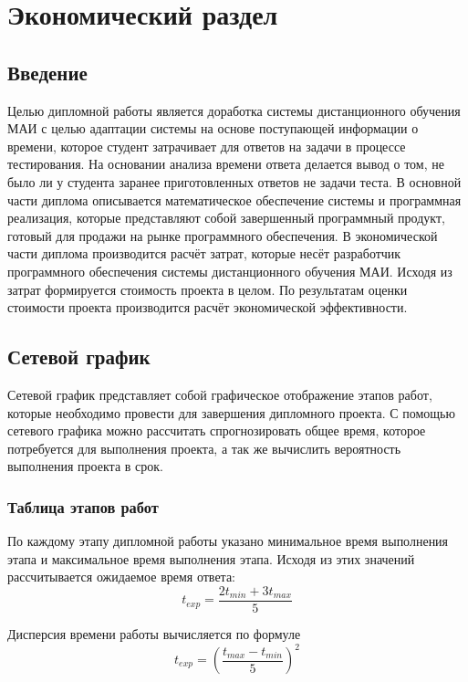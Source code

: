  \chapter{Экономический раздел}

 \section{Введение}

 Целью дипломной работы является доработка системы дистанционного обучения МАИ с целью адаптации системы на основе поступающей информа\-ции о времени, которое студент затрачивает для ответов на задачи в процессе тестирования. На основании анализа времени ответа делается вывод о том, не было ли у студента заранее приготовленных ответов не задачи теста.
В основной части диплома описывается математическое обеспечение системы и программная реализация, которые представляют собой завершенный прог\-раммный продукт, готовый для продажи на рынке программного обеспечения.
В экономической части диплома производится расчёт затрат, которые несёт разработчик программного обеспечения системы дистанционного обучения МАИ. Исходя из затрат формируется стоимость проекта в целом. По результа\-там оценки стоимости проекта производится расчёт экономической эффектив\-ности.

\section{Сетевой график}

Сетевой график представляет собой графическое отображение этапов работ, которые необходимо провести для завершения дипломного проекта. С помощью сетевого графика можно рассчитать спрогнозировать общее время, которое потребуется для выпол\-нения проекта, а так же вычислить вероятность выпол\-нения проекта в срок.

\subsection{Таблица этапов работ}
По каждому этапу дипломной работы указано минимальное время выпол\-нения этапа и максимальное время выпол\-нения этапа. Исходя из этих значений рассчитывается ожидаемое время ответа:
$$
t_{exp} = \frac{2t_{min}+3t_{max}}{5}
$$

Дисперсия времени работы вычисляется по формуле
$$
t_{exp} = \left( \frac{t_{max} - t_{min}}{5} \right)^2
$$


